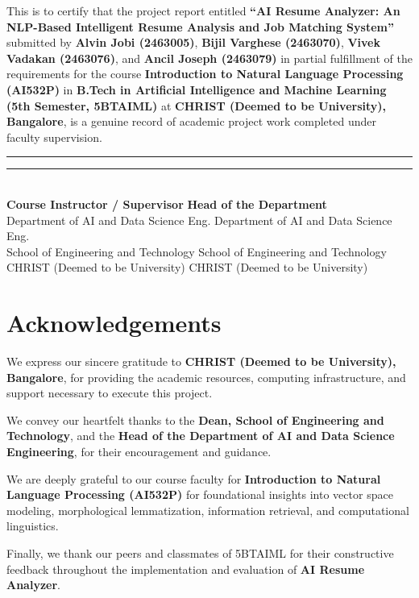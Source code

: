 \documentclass[12pt,a4paper]{report}
\begin{document}
This is to certify that the project report entitled \textbf{“AI Resume Analyzer: An NLP-Based Intelligent Resume Analysis and Job Matching System”} submitted by \textbf{Alvin Jobi (2463005)}, \textbf{Bijil Varghese (2463070)}, \textbf{Vivek Vadakan (2463076)}, and \textbf{Ancil Joseph (2463079)} in partial fulfillment of the requirements for the course \textbf{Introduction to Natural Language Processing (AI532P)} in \textbf{B.Tech in Artificial Intelligence and Machine Learning (5th Semester, 5BTAIML)} at \textbf{CHRIST (Deemed to be University), Bangalore}, is a genuine record of academic project work completed under faculty supervision.

\vspace{3cm}
\noindent
\rule{6cm}{0.4pt} \hfill \rule{6cm}{0.4pt}\\
\textbf{Course Instructor / Supervisor} \hfill \textbf{Head of the Department}\\
Department of AI and Data Science Eng. \hfill Department of AI and Data Science Eng.\\
School of Engineering and Technology \hfill School of Engineering and Technology\\
CHRIST (Deemed to be University) \hfill CHRIST (Deemed to be University)

\newpage
\chapter*{Acknowledgements}
\thispagestyle{plain}

We express our sincere gratitude to \textbf{CHRIST (Deemed to be University), Bangalore}, for providing the academic resources, computing infrastructure, and support necessary to execute this project.

We convey our heartfelt thanks to the \textbf{Dean, School of Engineering and Technology}, and the \textbf{Head of the Department of AI and Data Science Engineering}, for their encouragement and guidance.

We are deeply grateful to our course faculty for \textbf{Introduction to Natural Language Processing (AI532P)} for foundational insights into vector space modeling, morphological lemmatization, information retrieval, and computational linguistics.

Finally, we thank our peers and classmates of 5BTAIML for their constructive feedback throughout the implementation and evaluation of \textbf{AI Resume Analyzer}.
\end{document}
